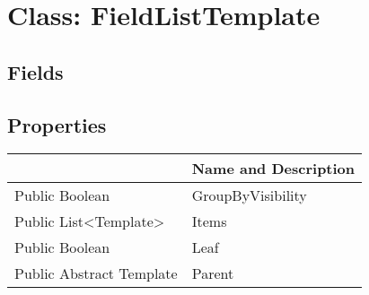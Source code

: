 \documentclass[11pt, oneside, a4paper]{book}
\begin{document}
\hypertarget{SoftwareEngineeringTools.{}Documentation.{}FieldListTemplate}{}
\section{Class: FieldListTemplate}

\subsection{Fields}

\subsection{Properties}
\begin{center}
\begin{tabular}{| p{3cm} | p{12cm} | }
\hline
\textbf{ } & \textbf{ Name and Description}\\
\hline
 Public  Boolean &  GroupByVisibility\hypertarget{SoftwareEngineeringTools.{}Documentation.{}FieldListTemplate.{}GroupByVisibility}{}\\
\hline
 Public  List<Template> &  Items\hypertarget{SoftwareEngineeringTools.{}Documentation.{}FieldListTemplate.{}Items}{}\\
\hline
 Public  Boolean &  Leaf\hypertarget{SoftwareEngineeringTools.{}Documentation.{}FieldListTemplate.{}Leaf}{}\\
\hline
 Public  Abstract  Template &  Parent\hypertarget{SoftwareEngineeringTools.{}Documentation.{}FieldListTemplate.{}Parent}{}\\
\hline
\end{tabular}
\end{center}
\end{document}
